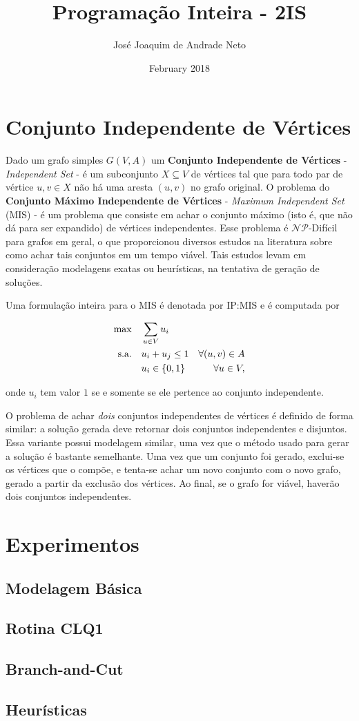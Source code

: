 \documentclass[12pt]{article}
\title{Programação Inteira - 2IS}
\author{José Joaquim de Andrade Neto}
\date{February 2018}
\begin{document}
\maketitle

\section{Conjunto Independente de Vértices}

Dado um grafo simples $G(V, A)$ um \textbf{Conjunto Independente de Vértices} - \textit{Independent Set} - é um subconjunto $X \subseteq V$ de vértices tal que para todo par de vértice $u, v \in X$ não há uma aresta $(u, v)$ no grafo original. O problema do \textbf{Conjunto Máximo Independente de Vértices} - \textit{Maximum Independent Set} (MIS) - é um problema que consiste em achar o conjunto máximo (isto é, que não dá para ser expandido) de vértices independentes. Esse problema é $\mathcal{NP}$-Difícil para grafos em geral, o que proporcionou diversos estudos na literatura sobre como achar tais conjuntos em um tempo viável. Tais estudos levam em consideração modelagens exatas ou heurísticas, na tentativa de geração de soluções.

Uma formulação inteira para o MIS é denotada por IP:MIS e é computada por

\begin{align*}	
  \max\quad        & \sum_{u \in V} u_i                                                          \\
  \text{s.a.\quad} & u_i + u_j \leq 1 &  \forall (u, v) \in A  								 \\
  				   & u_i \in \{0, 1\} & \forall u \in V,
\end{align*}

\noindent
onde $u_i$ tem valor $1$ se e somente se ele pertence ao conjunto independente.

O problema de achar \textsl{dois} conjuntos independentes de vértices é definido de forma similar: a solução gerada deve retornar dois conjuntos independentes e disjuntos. Essa variante possui modelagem similar, uma vez que o método usado para gerar a solução é bastante semelhante. Uma vez que um conjunto foi gerado, exclui-se os vértices que o compõe, e tenta-se achar um novo conjunto com o novo grafo, gerado a partir da exclusão dos vértices. Ao final, se o grafo for viável, haverão dois conjuntos independentes.


\section{Experimentos}
\subsection{Modelagem Básica}
\subsection{Rotina CLQ1}
\subsection{Branch-and-Cut}
\subsection{Heurísticas}
\end{document}
